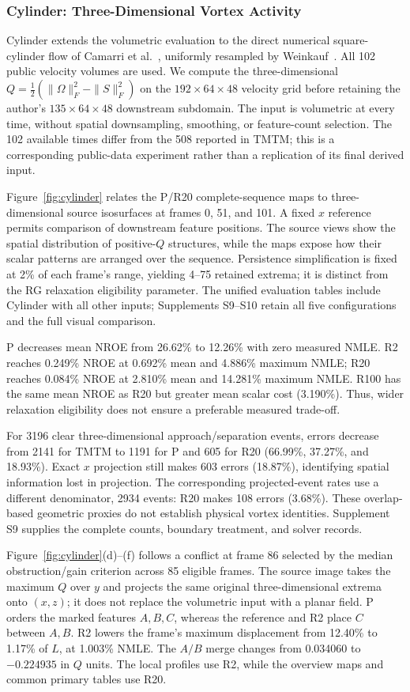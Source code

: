 \subsubsection{Cylinder: Three-Dimensional Vortex Activity}\label{sec:cylinder}
Cylinder extends the volumetric evaluation to the direct numerical square-cylinder flow of Camarri et al.~\cite{Camarri:2005:Cylinder}, uniformly resampled by Weinkauf~\cite{Weinkauf:SquareCylinder,Funck:2008:Smoke}. All 102 public velocity volumes are used. We compute the three-dimensional $Q=\tfrac12(\|\Omega\|_F^2-\|S\|_F^2)$ on the $192\times64\times48$ velocity grid before retaining the author's $135\times64\times48$ downstream subdomain. The input is volumetric at every time, without spatial downsampling, smoothing, or feature-count selection. The 102 available times differ from the 508 reported in TMTM; this is a corresponding public-data experiment rather than a replication of its final derived input.

Figure~\ref{fig:cylinder} relates the P/R20 complete-sequence maps to three-dimensional source isosurfaces at frames 0, 51, and 101. A fixed $x$ reference permits comparison of downstream feature positions. The source views show the spatial distribution of positive-$Q$ structures, while the maps expose how their scalar patterns are arranged over the sequence. Persistence simplification is fixed at 2\% of each frame's range, yielding 4--75 retained extrema; it is distinct from the RG relaxation eligibility parameter. The unified evaluation tables include Cylinder with all other inputs; Supplements S9--S10 retain all five configurations and the full visual comparison.

P decreases mean NROE from 26.62\% to 12.26\% with zero measured NMLE. R2 reaches 0.249\% NROE at 0.692\% mean and 4.886\% maximum NMLE; R20 reaches 0.084\% NROE at 2.810\% mean and 14.281\% maximum NMLE. R100 has the same mean NROE as R20 but greater mean scalar cost (3.190\%). Thus, wider relaxation eligibility does not ensure a preferable measured trade-off.

For 3196 clear three-dimensional approach/separation events, errors decrease from 2141 for TMTM to 1191 for P and 605 for R20 (66.99\%, 37.27\%, and 18.93\%). Exact $x$ projection still makes 603 errors (18.87\%), identifying spatial information lost in projection. The corresponding projected-event rates use a different denominator, 2934 events: R20 makes 108 errors (3.68\%). These overlap-based geometric proxies do not establish physical vortex identities. Supplement S9 supplies the complete counts, boundary treatment, and solver records.


Figure~\ref{fig:cylinder}(d)--(f) follows a conflict at frame 86 selected by the median obstruction/gain criterion across 85 eligible frames. The source image takes the maximum $Q$ over $y$ and projects the same original three-dimensional extrema onto $(x,z)$; it does not replace the volumetric input with a planar field. P orders the marked features $A,B,C$, whereas the reference and R2 place $C$ between $A,B$. R2 lowers the frame's maximum displacement from 12.40\% to 1.17\% of $L$, at 1.003\% NMLE. The $A/B$ merge changes from 0.034060 to $-0.224935$ in $Q$ units. The local profiles use R2, while the overview maps and common primary tables use R20.

